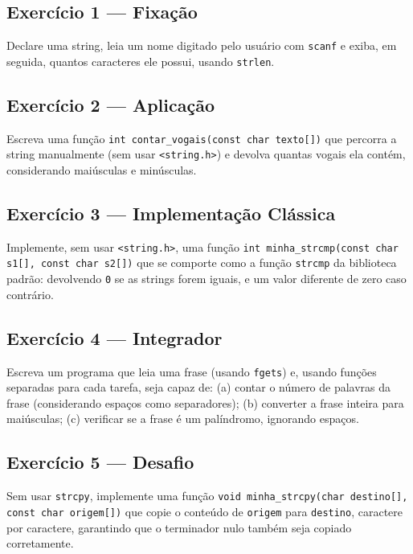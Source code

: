 \documentclass[12pt,a4paper,oneside]{extreport}
\begin{document}
\begin{exercicio}

\subsection*{Exercício 1 --- Fixação}
Declare uma string, leia um nome digitado pelo usuário com \texttt{scanf} e exiba, em seguida, quantos caracteres ele possui, usando \texttt{strlen}.

\subsection*{Exercício 2 --- Aplicação}
Escreva uma função \texttt{int contar\_vogais(const char texto[])} que percorra a string manualmente (sem usar \texttt{<string.h>}) e devolva quantas vogais ela contém, considerando maiúsculas e minúsculas.

\subsection*{Exercício 3 --- Implementação Clássica}
Implemente, sem usar \texttt{<string.h>}, uma função \texttt{int minha\_strcmp(const char s1[], const char s2[])} que se comporte como a função \texttt{strcmp} da biblioteca padrão: devolvendo \texttt{0} se as strings forem iguais, e um valor diferente de zero caso contrário.

\subsection*{Exercício 4 --- Integrador}
Escreva um programa que leia uma frase (usando \texttt{fgets}) e, usando funções separadas para cada tarefa, seja capaz de: (a) contar o número de palavras da frase (considerando espaços como separadores); (b) converter a frase inteira para maiúsculas; (c) verificar se a frase é um palíndromo, ignorando espaços.

\subsection*{Exercício 5 --- Desafio}
Sem usar \texttt{strcpy}, implemente uma função \texttt{void minha\_strcpy(char destino[], const char origem[])} que copie o conteúdo de \texttt{origem} para \texttt{destino}, caractere por caractere, garantindo que o terminador nulo também seja copiado corretamente.

\end{exercicio}
\end{document}
